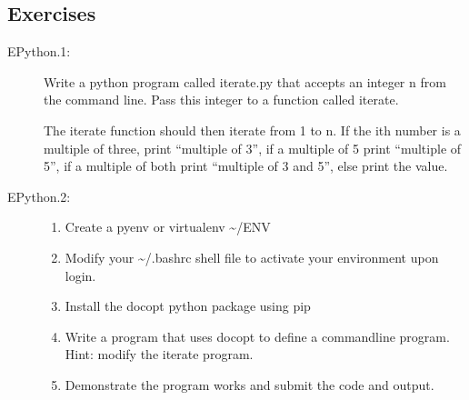 \subsection{Exercises}\label{exercises}

\begin{description}
\item[EPython.1:]
Write a python program called iterate.py that accepts an integer n from
the command line. Pass this integer to a function called iterate.

The iterate function should then iterate from 1 to n. If the ith number
is a multiple of three, print ``multiple of 3'', if a multiple of 5
print ``multiple of 5'', if a multiple of both print ``multiple of 3 and
5'', else print the value.
\item[EPython.2:]
\begin{enumerate}
\tightlist
\item
  Create a pyenv or virtualenv \textasciitilde{}/ENV
\item
  Modify your \textasciitilde{}/.bashrc shell file to activate your
  environment upon login.
\item
  Install the docopt python package using pip
\item
  Write a program that uses docopt to define a commandline program.
  Hint: modify the iterate program.
\item
  Demonstrate the program works and submit the code and output.
\end{enumerate}
\end{description}
